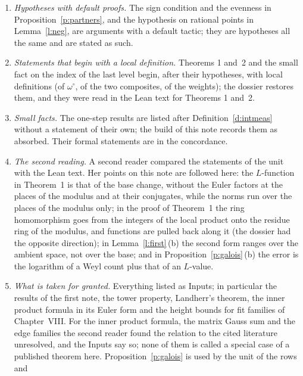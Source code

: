 \documentclass[11pt,a4paper]{article}
\theoremstyle{plainx}
\theoremstyle{uprightx}
\begin{document}
\begin{enumerate}[label=\textup{\arabic*.},leftmargin=1.6em,itemsep=5pt]
of the small facts. The doubt concerns implicit and instance arguments: which index sets, signs, primes with
their embeddings and instances a declaration takes. In particular, for the definitions of
Definition~\ref{d:crude}\,(f) that use the embedding of a prime it is not certain from the text whether Lean keeps
the primality of $\ell$ as a separate argument.
\item \emph{Hypotheses with default proofs.} The sign condition and the evenness in
Proposition~\ref{p:partners}, and the hypothesis on rational points in Lemma~\ref{l:neg}, are arguments with a
default tactic; they are hypotheses all the same and are stated as such.
\item \emph{Statements that begin with a local definition.} Theorems 1 and~2 and the small fact on the index of
the last level begin, after their hypotheses, with local definitions (of $\omega^{\circ}$, of the two composites,
of the weights); the dossier restores them, and they were read in the Lean text for Theorems 1 and~2.
\item \emph{Small facts.} The one-step results are listed after Definition~\ref{d:intmeas} without a
statement of their own; the build of this note records them as absorbed. Their formal statements are in the
concordance.
\item \emph{The second reading.} A second reader compared the statements of the unit with the Lean text. Her
points on this note are followed here: the $L$-function in Theorem~1 is that of the base change, without the Euler
factors at the places of the modulus and at their conjugates, while the norms run over the places of the modulus
only; in the proof of Theorem~1 the ring homomorphism goes from the integers of the local product onto the residue
ring of the modulus, and functions are pulled back along it (the dossier had the opposite direction); in
Lemma~\ref{l:first}\,(b) the second form ranges over the ambient space, not over the base; and in
Proposition~\ref{p:galois}\,(b) the error is the logarithm of a Weyl count plus that of an $L$-value.
\item \emph{What is taken for granted.} Everything listed as Inputs; in particular the results of the first
note, the tower property, Landherr's theorem, the inner product formula in its Euler form and the height bounds
for fit families of Chapter~VIII. For the inner product formula, the matrix Gauss sum and the edge families the
second reader found the relation to the cited literature unresolved, and the Inputs say so; none of them is
called a special case of a published theorem here. Proposition~\ref{p:galois} is used by the unit of the rows and

\end{enumerate}
\end{document}
